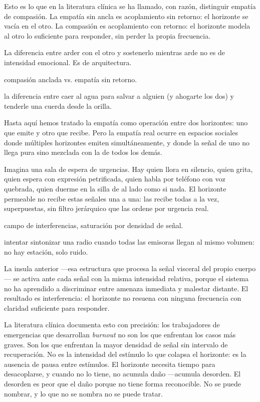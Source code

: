 Esto es lo que en la literatura clínica se ha llamado, con razón, distinguir empatía de compasión. La empatía sin ancla es acoplamiento sin retorno: el horizonte se vacía en el otro. La compasión es acoplamiento con retorno: el horizonte modela al otro lo suficiente para responder, sin perder la propia frecuencia.

La diferencia entre arder con el otro y sostenerlo mientras arde no es de intensidad emocional. Es de arquitectura.

\begin{fisica}
 compasión anclada vs. empatía sin retorno.

 la diferencia entre caer al agua para salvar a alguien (y ahogarte los dos) y tenderle una cuerda desde la orilla.
\end{fisica}
\noindent Hasta aquí hemos tratado la empatía como operación entre dos horizontes: uno que emite y otro que recibe. Pero la empatía real ocurre en espacios sociales donde múltiples horizontes emiten simultáneamente, y donde la señal de uno no llega pura sino mezclada con la de todos los demás.

Imagina una sala de espera de urgencias. Hay quien llora en silencio, quien grita, quien espera con expresión petrificada, quien habla por teléfono con voz quebrada, quien duerme en la silla de al lado como si nada. El horizonte permeable no recibe estas señales una a una: las recibe todas a la vez, superpuestas, sin filtro jerárquico que las ordene por urgencia real.

\begin{fisica}
 campo de interferencias, saturación por densidad de señal.

 intentar sintonizar una radio cuando todas las emisoras llegan al mismo volumen: no hay estación, solo ruido.
\end{fisica}
La insula anterior —esa estructura que procesa la señal visceral del propio cuerpo— se activa ante cada señal con la misma intensidad relativa, porque el sistema no ha aprendido a discriminar entre amenaza inmediata y malestar distante. El resultado es interferencia: el horizonte no resuena con ninguna frecuencia con claridad suficiente para responder.

La literatura clínica documenta esto con precisión: los trabajadores de emergencias que desarrollan \emph{burnout} no son los que enfrentan los casos más graves. Son los que enfrentan la mayor densidad de señal sin intervalo de recuperación. No es la intensidad del estímulo lo que colapsa el horizonte: es la ausencia de pausa entre estímulos. El horizonte necesita tiempo para desacoplarse, y cuando no lo tiene, no acumula daño —acumula desorden. El desorden es peor que el daño porque no tiene forma reconocible. No se puede nombrar, y lo que no se nombra no se puede tratar.

